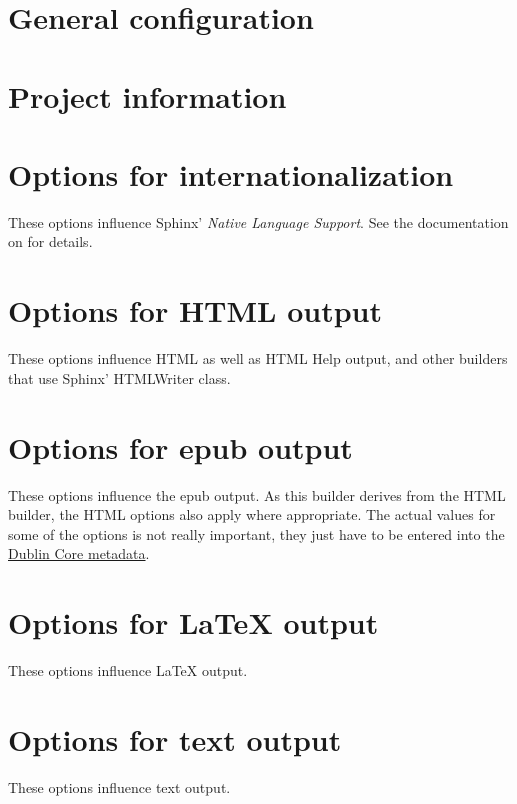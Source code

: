 \documentclass[letterpaper,10pt,english]{sphinxmanual}
\begin{document}
\section{General configuration}
\label{config:general-configuration}

\section{Project information}
\label{config:project-information}

\section{Options for internationalization}
\label{config:intl-options}\label{config:options-for-internationalization}
These options influence Sphinx' \emph{Native Language Support}.  See the
documentation on {\hyperref[intl:intl]{}} for details.


\section{Options for HTML output}
\label{config:html-options}\label{config:options-for-html-output}
These options influence HTML as well as HTML Help output, and other builders
that use Sphinx' HTMLWriter class.


\section{Options for epub output}
\label{config:epub-options}\label{config:options-for-epub-output}
These options influence the epub output.  As this builder derives from the HTML
builder, the HTML options also apply where appropriate.  The actual values for
some of the options is not really important, they just have to be entered into
the \href{http://dublincore.org/}{Dublin Core metadata}.


\section{Options for LaTeX output}
\label{config:options-for-latex-output}\label{config:latex-options}
These options influence LaTeX output.


\section{Options for text output}
\label{config:options-for-text-output}\label{config:text-options}
These options influence text output.
\end{document}
